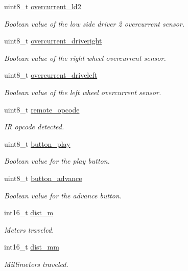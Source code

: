 \begin{DoxyCompactItemize}
uint8\_\-t \hyperlink{structoi__t_a9f310b5da0c5b3d83a68ccbdc0339527}{overcurrent\_\-ld2}
\begin{DoxyCompactList}\small\item\em Boolean value of the low side driver 2 overcurrent sensor. \end{DoxyCompactList}\item 
uint8\_\-t \hyperlink{structoi__t_ac6cb8e71fd22ed64e8774c9bdfed8eb6}{overcurrent\_\-driveright}
\begin{DoxyCompactList}\small\item\em Boolean value of the right wheel overcurrent sensor. \end{DoxyCompactList}\item 
uint8\_\-t \hyperlink{structoi__t_aa1e11a40bb2181e9c7daf3f7c3a08f1d}{overcurrent\_\-driveleft}
\begin{DoxyCompactList}\small\item\em Boolean value of the left wheel overcurrent sensor. \end{DoxyCompactList}\item 
uint8\_\-t \hyperlink{structoi__t_a7bfafbcc62f7eb3939b7bcd72065c377}{remote\_\-opcode}
\begin{DoxyCompactList}\small\item\em IR opcode detected. \end{DoxyCompactList}\item 
uint8\_\-t \hyperlink{structoi__t_a2a0dc2eb8d0879a04cbeaf477fe091c3}{button\_\-play}
\begin{DoxyCompactList}\small\item\em Boolean value for the play button. \end{DoxyCompactList}\item 
uint8\_\-t \hyperlink{structoi__t_a4636e65c1a0beac75914c1ac2da5826e}{button\_\-advance}
\begin{DoxyCompactList}\small\item\em Boolean value for the advance button. \end{DoxyCompactList}\item 
int16\_\-t \hyperlink{structoi__t_a04e77f3cefe5701cb98b7a783ac63b72}{dist\_\-m}
\begin{DoxyCompactList}\small\item\em Meters traveled. \end{DoxyCompactList}\item 
int16\_\-t \hyperlink{structoi__t_aa98fddc94e23d713ecaa8f9f4db9454c}{dist\_\-mm}
\begin{DoxyCompactList}\small\item\em Millimeters traveled. \end{DoxyCompactList}\item 

\end{DoxyCompactItemize}
